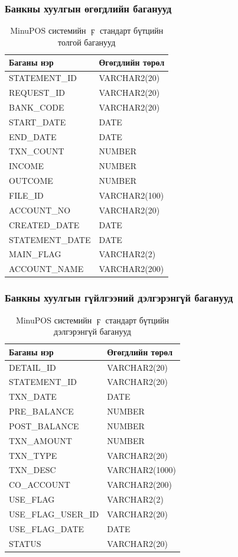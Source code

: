 \subsubsection{Банкны хуулгын өгөгдлийн баганууд}
\begin{table}[h]
\centering
\caption{MinuPOS системийн $\digamma$ стандарт бүтцийн толгой баганууд}
\begin{tabular}{|p{5cm}|p{5cm}|}
\hline
\textbf{Баганы нэр} & \textbf{Өгөгдлийн төрөл} \\ \hline
STATEMENT\_ID & VARCHAR2(20) \\ \hline
REQUEST\_ID & VARCHAR2(20) \\ \hline
BANK\_CODE & VARCHAR2(20) \\ \hline
START\_DATE & DATE \\ \hline
END\_DATE & DATE \\ \hline
TXN\_COUNT & NUMBER \\ \hline
INCOME & NUMBER \\ \hline
OUTCOME & NUMBER \\ \hline
FILE\_ID & VARCHAR2(100) \\ \hline
ACCOUNT\_NO & VARCHAR2(20) \\ \hline
CREATED\_DATE & DATE \\ \hline
STATEMENT\_DATE & DATE \\ \hline
MAIN\_FLAG & VARCHAR2(2) \\ \hline
ACCOUNT\_NAME & VARCHAR2(200) \\ \hline
\end{tabular}
\end{table}
\newpage
\subsubsection{Банкны хуулгын гүйлгээний дэлгэрэнгүй баганууд}
\begin{table}[h]
\centering
\caption{MinuPOS системийн $\digamma$ стандарт бүтцийн дэлгэрэнгүй баганууд}
\begin{tabular}{|p{5cm}|p{5cm}|}
\hline
\textbf{Баганы нэр} & \textbf{Өгөгдлийн төрөл} \\ \hline
DETAIL\_ID & VARCHAR2(20) \\ \hline
STATEMENT\_ID & VARCHAR2(20) \\ \hline
TXN\_DATE & DATE \\ \hline
PRE\_BALANCE & NUMBER \\ \hline
POST\_BALANCE & NUMBER \\ \hline
TXN\_AMOUNT & NUMBER \\ \hline
TXN\_TYPE & VARCHAR2(20) \\ \hline
TXN\_DESC & VARCHAR2(1000) \\ \hline
CO\_ACCOUNT & VARCHAR2(200) \\ \hline
USE\_FLAG & VARCHAR2(2) \\ \hline
USE\_FLAG\_USER\_ID & VARCHAR2(20) \\ \hline
USE\_FLAG\_DATE & DATE \\ \hline
STATUS & VARCHAR2(20) \\ \hline
\end{tabular}
\end{table}

